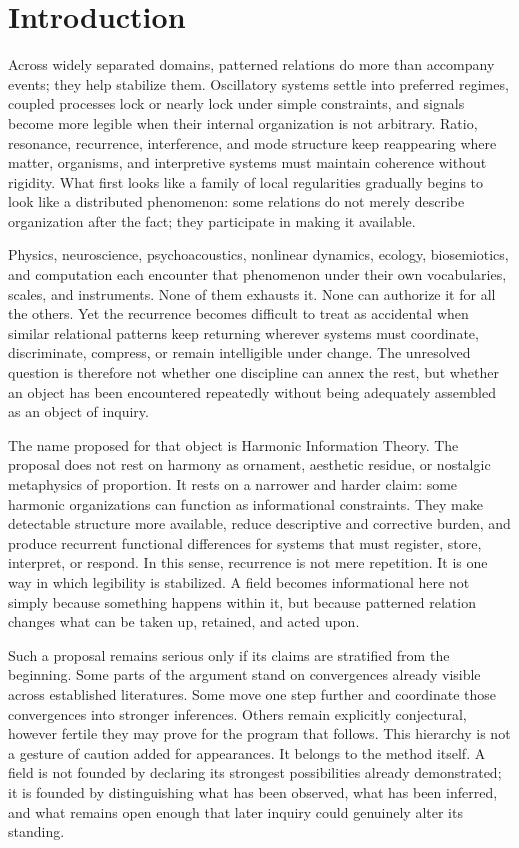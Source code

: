 
\chapter*{Introduction}

Across widely separated domains, patterned relations do more than accompany events; they help stabilize them. Oscillatory systems settle into preferred regimes, coupled processes lock or nearly lock under simple constraints, and signals become more legible when their internal organization is not arbitrary. Ratio, resonance, recurrence, interference, and mode structure keep reappearing where matter, organisms, and interpretive systems must maintain coherence without rigidity. What first looks like a family of local regularities gradually begins to look like a distributed phenomenon: some relations do not merely describe organization after the fact; they participate in making it available.

Physics, neuroscience, psychoacoustics, nonlinear dynamics, ecology, biosemiotics, and computation each encounter that phenomenon under their own vocabularies, scales, and instruments. None of them exhausts it. None can authorize it for all the others. Yet the recurrence becomes difficult to treat as accidental when similar relational patterns keep returning wherever systems must coordinate, discriminate, compress, or remain intelligible under change. The unresolved question is therefore not whether one discipline can annex the rest, but whether an object has been encountered repeatedly without being adequately assembled as an object of inquiry.

The name proposed for that object is Harmonic Information Theory. The proposal does not rest on harmony as ornament, aesthetic residue, or nostalgic metaphysics of proportion. It rests on a narrower and harder claim: some harmonic organizations can function as informational constraints. They make detectable structure more available, reduce descriptive and corrective burden, and produce recurrent functional differences for systems that must register, store, interpret, or respond. In this sense, recurrence is not mere repetition. It is one way in which legibility is stabilized. A field becomes informational here not simply because something happens within it, but because patterned relation changes what can be taken up, retained, and acted upon.

Such a proposal remains serious only if its claims are stratified from the beginning. Some parts of the argument stand on convergences already visible across established literatures. Some move one step further and coordinate those convergences into stronger inferences. Others remain explicitly conjectural, however fertile they may prove for the program that follows. This hierarchy is not a gesture of caution added for appearances. It belongs to the method itself. A field is not founded by declaring its strongest possibilities already demonstrated; it is founded by distinguishing what has been observed, what has been inferred, and what remains open enough that later inquiry could genuinely alter its standing.

